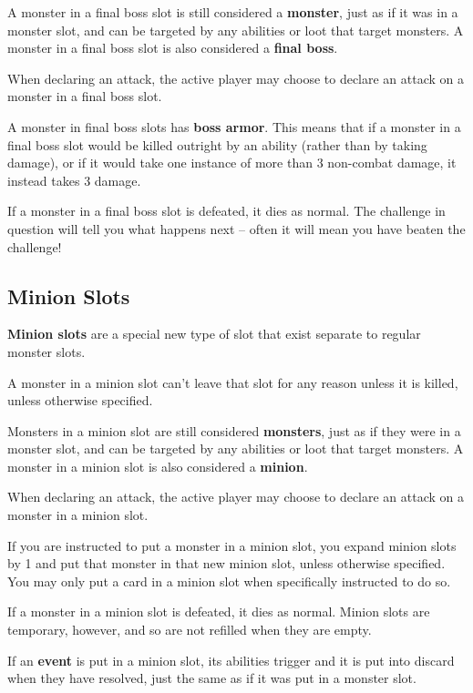 \documentclass[
  fontsize=10pt,
  paper=a5,
  version=last,
  chapterprefix=true,
  bindingoffset=5mm,
  ]{scrbook}
\begin{document}
    A monster in a final boss slot is still considered a \textbf{monster}, just as if it was in a monster slot, and can be targeted by any abilities or loot that target monsters. A monster in a final boss slot is also considered a \textbf{final boss}.

    When declaring an attack, the active player may choose to declare an attack on a monster in a final boss slot.

    A monster in final boss slots has \textbf{boss armor}. This means that if a monster in a final boss slot would be killed outright by an ability (rather than by taking damage), or if it would take one instance of more than 3 non-combat damage, it instead takes 3 damage.

    If a monster in a final boss slot is defeated, it dies as normal. The challenge in question will tell you what happens next – often it will mean you have beaten the challenge!

    \subsection*{Minion Slots}
    \textbf{Minion slots} are a special new type of slot that exist separate to regular monster slots.

    A monster in a minion slot can’t leave that slot for any reason unless it is killed, unless otherwise specified.

    Monsters in a minion slot are still considered \textbf{monsters}, just as if they were in a monster slot, and can be targeted by any abilities or loot that target monsters. A monster in a minion slot is also considered a \textbf{minion}.

    When declaring an attack, the active player may choose to declare an attack on a monster in a minion slot.

    If you are instructed to put a monster in a minion slot, you expand minion slots by 1 and put that monster in that new minion slot, unless otherwise specified. You may only put a card in a minion slot when specifically instructed to do so.

    If a monster in a minion slot is defeated, it dies as normal. Minion slots are temporary, however, and so are not refilled when they are empty.

    If an \textbf{event} is put in a minion slot, its abilities trigger and it is put into discard when they have resolved, just the same as if it was put in a monster slot.
\end{document}
